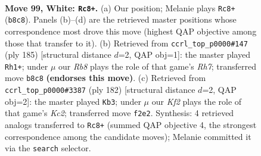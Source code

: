 \documentclass[11pt]{article}
\begin{document}
\begin{figure}[p]\centering
\begin{subfigure}{0.46\textwidth}\centering
\resizebox{\linewidth}{!}{%
\newchessgame
\chessboard[
  setfen={1R6/8/8/2k5/7r/r7/5K2/8 w - - 8 99},
  showmover=false,
  pgfstyle=straightmove, color=movearrow, markmove={b8-c8}
]}
\caption{}
\end{subfigure}\hfill
\begin{subfigure}{0.46\textwidth}\centering
\resizebox{\linewidth}{!}{%
\newchessgame
\chessboard[
  setfen={1k6/8/8/8/8/2R5/7r/3K4 b - - 17 93},
  showmover=false,
  pgfstyle=straightmove, color=movearrow, markmove={h2-h1}
]}
\caption{}
\end{subfigure}
\\[4pt]
\begin{subfigure}{0.46\textwidth}\centering
\resizebox{\linewidth}{!}{%
\newchessgame
\chessboard[
  setfen={1R6/r7/3r4/8/7R/8/2K3k1/8 w - - 18 92},
  showmover=false,
  pgfstyle=straightmove, color=movearrow, markmove={c2-b3}
]}
\caption{}
\end{subfigure}\hfill

\caption{\textbf{Move 99, White: \texttt{Rc8+}.} (a) Our position; Melanie plays \texttt{Rc8+} (\texttt{b8c8}). Panels (b)--(d) are the retrieved master positions whose correspondence most drove this move (highest QAP objective among those that transfer to it). (b) Retrieved from \texttt{ccrl\_top\_p0000\#147} (ply 185) [structural distance $d$=2, QAP obj=1]: the master played \texttt{Rh1+}; under $\mu$ our \emph{Rb8} plays the role of that game's \emph{Rh7}; transferred move \texttt{b8c8} \textbf{(endorses this move)}. (c) Retrieved from \texttt{ccrl\_top\_p0000\#3387} (ply 182) [structural distance $d$=2, QAP obj=2]: the master played \texttt{Kb3}; under $\mu$ our \emph{Kf2} plays the role of that game's \emph{Kc2}; transferred move \texttt{f2e2}. Synthesis: 4 retrieved analogs transferred to \texttt{Rc8+} (summed QAP objective 4, the strongest correspondence among the candidate moves); Melanie committed it via the \texttt{search} selector.}
\label{fig:thought-m196}
\end{figure}

\clearpage
\end{document}
